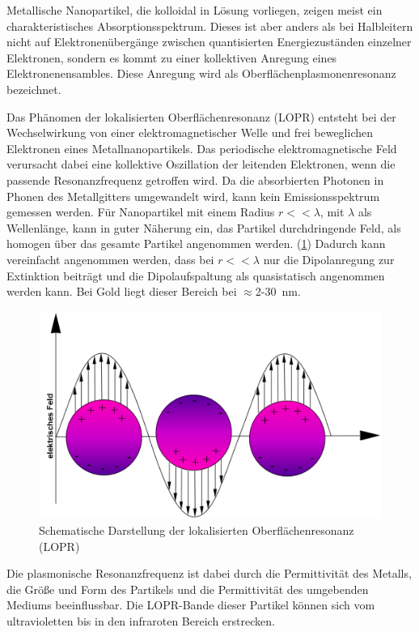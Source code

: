     Metallische Nanopartikel, die kolloidal in Lösung vorliegen, zeigen meist ein charakteristisches Absorptionsspektrum.
    Dieses ist aber anders als bei Halbleitern nicht auf Elektronenübergänge zwischen quantisierten Energiezuständen einzelner Elektronen, sondern es kommt zu einer kollektiven Anregung eines Elektronenensambles.
    Diese Anregung wird als Oberflächenplasmonenresonanz bezeichnet. \autocite{Mulvaney1996}
    
    Das Phänomen der lokalisierten Oberflächenresonanz (LOPR) entsteht bei der Wechselwirkung von einer elektromagnetischer Welle und frei beweglichen Elektronen eines Metallnanopartikels.\autocite{Hu2006}
    Das periodische elektromagnetische Feld verursacht dabei eine kollektive Oszillation der leitenden Elektronen, wenn die passende Resonanzfrequenz getroffen wird.
    Da die absorbierten Photonen in Phonen des Metallgitters umgewandelt wird, kann kein Emissionsspektrum gemessen werden.
    Für Nanopartikel mit einem Radius $r<<\lambda$, mit $\lambda$ als Wellenlänge, kann in guter Näherung ein, das Partikel durchdringende Feld, als homogen über das gesamte Partikel angenommen werden. (\cref{fig:LOPR}) \autocite{Xu1999}
    Dadurch kann vereinfacht angenommen werden, dass bei $r<<\lambda$ nur die Dipolanregung zur Extinktion beiträgt und die Dipolaufspaltung als quasistatisch angenommen werden kann. 
    Bei Gold liegt dieser Bereich bei $\approx$2-30~nm.
    
    \begin{figure}
        \centering
        \includegraphics[width=0.6\linewidth]{Bilder/LSPR}
        \caption{Schematische Darstellung der lokalisierten Oberflächenresonanz (LOPR)}
        \label{fig:LOPR}
    \end{figure}
    
    Die plasmonische Resonanzfrequenz ist dabei durch die Permittivität des Metalls, die Größe und Form des Partikels und die Permittivität des umgebenden Mediums beeinflussbar. \autocite{Kelly2003,Mock2003}
    Die LOPR-Bande dieser Partikel können sich vom ultravioletten bis in den infraroten Bereich erstrecken. \autocite{Haes2004}
    

